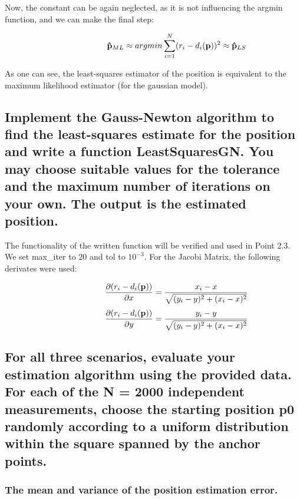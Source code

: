 Now, the constant can be again neglected, as it is not influencing the argmin function, and we can make the final step:

\begin{align*}
\hspace*{2cm}
\mathbf{\hat{p}}_{ML} \approx argmin \sum\limits_{i=1}^N (r_i-d_i(\mathbf{p}))^2 \approx \mathbf{\hat{p}}_{LS}\\
\end{align*}

As one can see, the least-squares estimator of the position is equivalent to the maximum likelihood estimator (for the gaussian model).

\subsection{Implement the Gauss-Newton algorithm to find the least-squares estimate for the position and write a function LeastSquaresGN. You may choose suitable values for the tolerance and the maximum number of iterations on your own. The output is the estimated position.}

The functionality of the written function will be verified and used in Point 2.3.
We set max\_iter to $20$ and tol to $10^{-3}$.
For the Jacobi Matrix, the following derivates were used:

\begin{align*}
\hspace*{2cm}
\dfrac{\partial(r_i-d_i(\mathbf{p}))}{\partial x} = \dfrac{x_i - x}{\sqrt{(y_i - y)^2 + (x_i - x)^2}}\\
\end{align*}
\begin{align*}
\hspace*{2cm}
\dfrac{\partial(r_i-d_i(\mathbf{p}))}{\partial y} = \dfrac{y_i - y}{\sqrt{(y_i - y)^2 + (x_i - x)^2}}\\
\end{align*}



\subsection{For all three scenarios, evaluate your estimation algorithm using the provided data. For each of the N = 2000 independent measurements, choose the starting position p0 randomly according to a uniform distribution within the square spanned by the anchor points.}

\subsubsection{The mean and variance of the position estimation error.}

